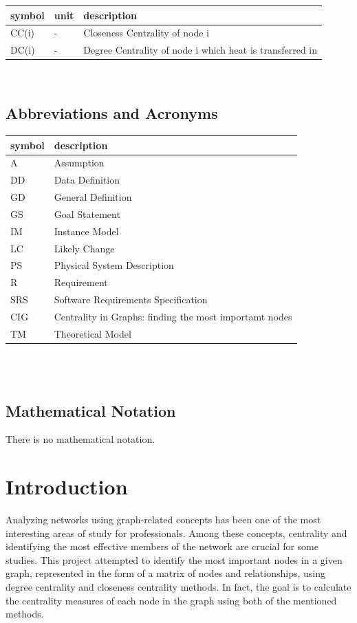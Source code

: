 \documentclass[12pt]{article}
\begin{document}
\renewcommand{\arraystretch}{1.2}
\noindent \begin{longtable*}{l l p{12cm}} \toprule
\textbf{symbol} & \textbf{unit} & \textbf{description}\\
\midrule 
CC(i)& \si[per-mode=symbol] {-} & Closeness Centrality of node i
\\DC(i) & \si[per-mode=symbol] {-} & Degree Centrality of node i
which heat is transferred in
\\ 
\bottomrule
\end{longtable*}
\

\subsection{Abbreviations and Acronyms}

\renewcommand{\arraystretch}{1.2}
\begin{tabular}{l l} 
  \toprule		
  \textbf{symbol} & \textbf{description}\\
  \midrule 
  A & Assumption\\
  DD & Data Definition\\
  GD & General Definition\\
  GS & Goal Statement\\
  IM & Instance Model\\
  LC & Likely Change\\
  PS & Physical System Description\\
  R & Requirement\\
  SRS & Software Requirements Specification\\
CIG &  Centrality in Graphs: finding the most importamt nodes\\
  TM & Theoretical Model\\
  \bottomrule
\end{tabular}\\

\

\subsection{Mathematical Notation}
 There is no mathematical notation.

\section{Introduction}


Analyzing networks using graph-related concepts has been one of the most interesting areas of study for professionals. Among these concepts, centrality and identifying the most effective members of the network are crucial for some studies. This project attempted to identify the most important nodes in a given graph, represented in the form of a matrix of nodes and relationships, using degree centrality and closeness centrality methods. In fact, the goal is to calculate the centrality measures of each node in the graph using both of the mentioned methods.
\end{document}
